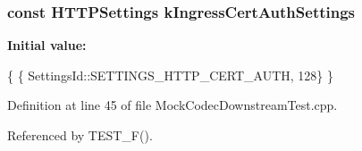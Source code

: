 \subsubsection[{k\+Ingress\+Cert\+Auth\+Settings}]{\setlength{\rightskip}{0pt plus 5cm}const {\bf H\+T\+T\+P\+Settings} k\+Ingress\+Cert\+Auth\+Settings}\label{MockCodecDownstreamTest_8cpp_a4b280fc87dc15de3c2c3846e575271ce}
{\bfseries Initial value\+:}
\begin{DoxyCode}
\{
  \{ SettingsId::SETTINGS\_HTTP\_CERT\_AUTH, 128\}
\}
\end{DoxyCode}


Definition at line 45 of file Mock\+Codec\+Downstream\+Test.\+cpp.



Referenced by T\+E\+S\+T\+\_\+\+F().

